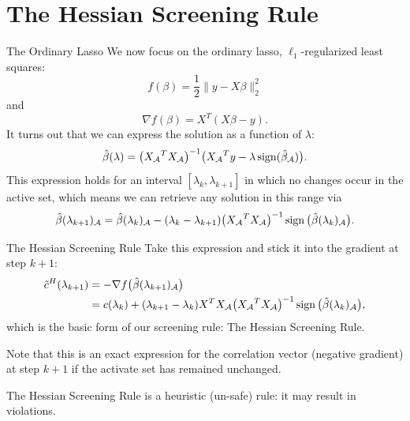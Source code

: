 \section{The Hessian Screening Rule}

\begin{frame}{The Ordinary Lasso}
  We now focus on the ordinary lasso, \(\ell_1\)-regularized least
  squares:
  \[
    f(\beta) = \frac 1 2 \lVert y - X\beta \rVert_2^2
  \]
  and
  \[
    \nabla f(\beta) = X^T(X\beta - y).
  \]
  \pause
  It turns out that we can express the solution as a function of
  \(\lambda\):
  \begin{equation*}
    \label{eq:solution}
    \hat\beta(\lambda) = \big({X_\mathcal{A}}^TX_\mathcal{A}\big)^{-1}
    \big({X_\mathcal{A}}^Ty - \lambda \operatorname{sign}(\hat\beta_\mathcal{A})\big).
  \end{equation*}
  \pause
  This expression holds for an interval \([\lambda_k,\lambda_{k+1}]\) in which
  no changes occur in the active set, which means we can retrieve any solution
  in this range via
  \begin{equation*}
    \hat\beta(\lambda_{k+1})_\mathcal{A} =
    \hat\beta(\lambda_k)_\mathcal{A} -
    (\lambda_k - \lambda_{k+1})\big({X_\mathcal{A}}^TX_\mathcal{A}\big)^{-1}
    \operatorname{sign}\big(\hat\beta(\lambda_k)_\mathcal{A}\big).
  \end{equation*}
\end{frame}

\begin{frame}{The Hessian Screening Rule}
  Take this expression and stick it into the gradient at step \(k +
  1\):
  \begin{equation*}
    \begin{aligned}
      \tilde c^H(\lambda_{k+1})
       & = -\nabla f\big(\hat\beta(\lambda_{k+1})_\mathcal{A}\big)       \\
       & = c(\lambda_k) + (\lambda_{k+1} - \lambda_k)X^T {X_\mathcal{A}}
      \big({X_\mathcal{A}}^T{X_\mathcal{A}}\big)^{-1}
      \operatorname{sign}\big(\hat\beta(\lambda_k)_\mathcal{A}\big),
    \end{aligned}
  \end{equation*}
  which is the basic form of our screening rule: \alert{The Hessian Screening
    Rule}. \medskip

  Note that this is an exact expression for the correlation vector (negative
  gradient) at step \(k+1\) if the activate set has remained unchanged.\medskip

  The Hessian Screening Rule is a heuristic (un-safe) rule: it may result in
  violations.
\end{frame}

